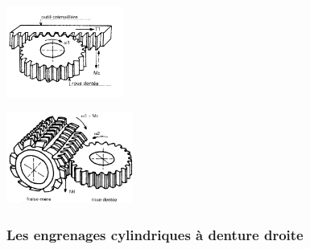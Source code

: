 \documentclass[11pt,oneside]{article}
\begin{document}
\begin{minipage}[c]{.45\linewidth}
\begin{center}
\includegraphics[height=3cm]{png/fig_61}
\end{center}
\end{minipage} \hfill
\begin{minipage}[c]{.45\linewidth}
\begin{center}
\includegraphics[height=3cm]{png/fig_62}
\end{center}
\end{minipage}


\subsubsection{Les engrenages cylindriques à denture droite}
\end{document}
